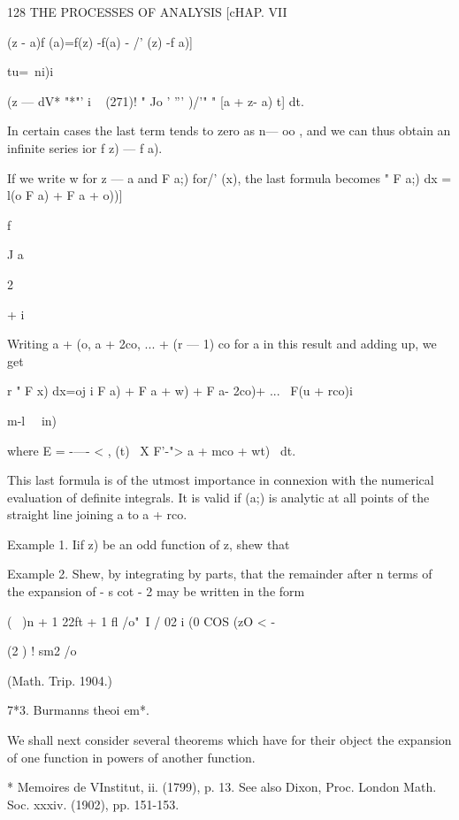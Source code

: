 128 THE PROCESSES OF ANALYSIS [cHAP. VII



(z - a)f (a)=f(z) -f(a) - /' (z) -f a)]

tu=\ ni)i

(z — dV* "*"' i ~ (271)! " Jo ' ''' )/'" " [a + z- a) t] dt.

In certain cases the last term tends to zero as n— oo , and we can
thus obtain an infinite series ior f z) — f a).

If we write w for z — a and F a;) for/' (x), the last formula becomes
" F a;) dx = l(o F a) + F a + o))]



f

J a



2

+ i









Writing a + (o, a + 2co, ... + (r — 1) co for a in this result and
adding up, we get

r " F x) dx=oj i F a) + F a + w) + F a- 2co)+ ... \ F(u + rco)i

m-l \ \ in)\

where E = -—- < , (t) \ X F'-"> a + mco + wt) \ dt.

This last formula is of the utmost importance in connexion with the
numerical evaluation of definite integrals. It is valid if (a;) is
analytic at all points of the straight line joining a to a + rco.

Example 1. Iif z) be an odd function of z, shew that

Example 2. Shew, by integrating by parts, that the remainder after n
terms of the expansion of - s cot - 2 may be written in the form

( \ )n + 1 22ft + 1 fl /o"\ I / 02 i (0 COS (zO < -

(2 ) ! sm2 /o

(Math. Trip. 1904.)

7*3. Burmanns theoi em*.

We shall next consider several theorems which have for their object
the expansion of one function in powers of another function.

* Memoires de VInstitut, ii. (1799), p. 13. See also Dixon, Proc.
London Math. Soc. xxxiv. (1902), pp. 151-153.



